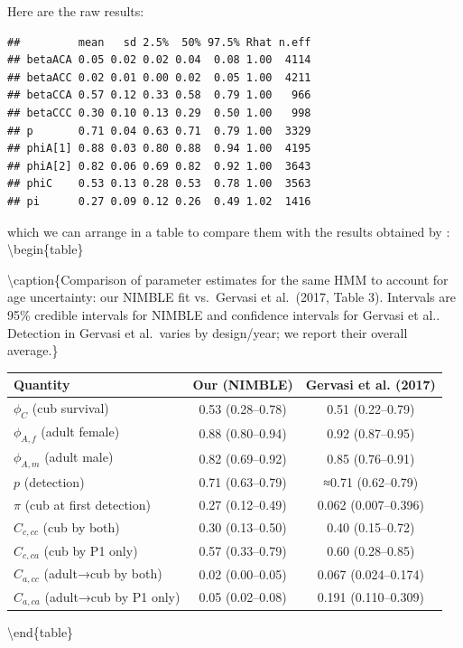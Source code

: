 \documentclass[
  12pt,
]{krantz}
\begin{document}
Here are the raw results:

\begin{verbatim}
##         mean   sd 2.5%  50% 97.5% Rhat n.eff
## betaACA 0.05 0.02 0.02 0.04  0.08 1.00  4114
## betaACC 0.02 0.01 0.00 0.02  0.05 1.00  4211
## betaCCA 0.57 0.12 0.33 0.58  0.79 1.00   966
## betaCCC 0.30 0.10 0.13 0.29  0.50 1.00   998
## p       0.71 0.04 0.63 0.71  0.79 1.00  3329
## phiA[1] 0.88 0.03 0.80 0.88  0.94 1.00  4195
## phiA[2] 0.82 0.06 0.69 0.82  0.92 1.00  3643
## phiC    0.53 0.13 0.28 0.53  0.78 1.00  3563
## pi      0.27 0.09 0.12 0.26  0.49 1.02  1416
\end{verbatim}

which we can arrange in a table to compare them with the results obtained by \citet{Gervasi2017}:
\textbackslash begin\{table\}

\textbackslash caption\{\label{tab:unnamed-chunk-390}Comparison of parameter estimates for the same HMM to account for age uncertainty: our NIMBLE fit vs.~Gervasi et al.~(2017, Table 3). Intervals are 95\% credible intervals for NIMBLE and confidence intervals for Gervasi et al.. Detection in Gervasi et al.~varies by design/year; we report their overall average.\}
\centering

\begin{tabular}[t]{l|c|c}
\hline
Quantity & Our (NIMBLE) & Gervasi et al. (2017)\\
\hline
$\phi_C$ (cub survival) & 0.53 (0.28–0.78) & 0.51 (0.22–0.79)\\
\hline
$\phi_{A,f}$ (adult female) & 0.88 (0.80–0.94) & 0.92 (0.87–0.95)\\
\hline
$\phi_{A,m}$ (adult male) & 0.82 (0.69–0.92) & 0.85 (0.76–0.91)\\
\hline
$p$ (detection) & 0.71 (0.63–0.79) & ≈0.71 (0.62–0.79)\\
\hline
$\pi$ (cub at first detection) & 0.27 (0.12–0.49) & 0.062 (0.007–0.396)\\
\hline
$C_{c,cc}$ (cub by both) & 0.30 (0.13–0.50) & 0.40 (0.15–0.72)\\
\hline
$C_{c,ca}$ (cub by P1 only) & 0.57 (0.33–0.79) & 0.60 (0.28–0.85)\\
\hline
$C_{a,cc}$ (adult→cub by both) & 0.02 (0.00–0.05) & 0.067 (0.024–0.174)\\
\hline
$C_{a,ca}$ (adult→cub by P1 only) & 0.05 (0.02–0.08) & 0.191 (0.110–0.309)\\
\hline
\end{tabular}

\textbackslash end\{table\}
\end{document}
